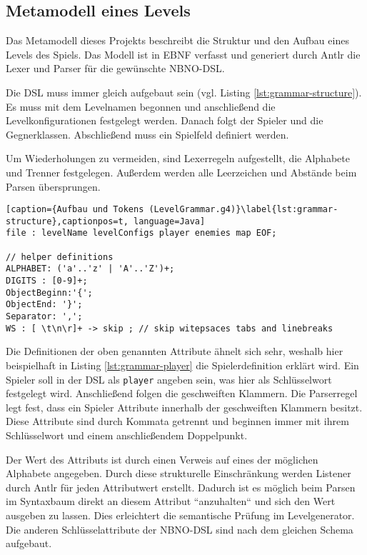 \subsection{Metamodell eines Levels}
Das Metamodell dieses Projekts beschreibt die Struktur und den Aufbau eines Levels des Spiels. Das Modell ist in EBNF verfasst und generiert durch Antlr die Lexer und Parser für die gewünschte NBNO-DSL.

Die DSL muss immer gleich aufgebaut sein (vgl. Listing \ref{lst:grammar-structure}). Es muss mit dem Levelnamen begonnen und anschließend die Levelkonfigurationen festgelegt werden. Danach folgt der Spieler und die Gegnerklassen. Abschließend muss ein Spielfeld definiert werden.

Um Wiederholungen zu vermeiden, sind Lexerregeln aufgestellt, die Alphabete und Trenner festgelegen.
Außerdem werden alle Leerzeichen und Abstände beim Parsen übersprungen.

\begin{lstlisting}[caption={Aufbau und Tokens (LevelGrammar.g4)}\label{lst:grammar-structure},captionpos=t, language=Java] 
file : levelName levelConfigs player enemies map EOF;

// helper definitions
ALPHABET: ('a'..'z' | 'A'..'Z')+;
DIGITS : [0-9]+;
ObjectBeginn:'{';
ObjectEnd: '}';
Separator: ',';
WS : [ \t\n\r]+ -> skip ; // skip witepsaces tabs and linebreaks
\end{lstlisting}
 
Die Definitionen der oben genannten Attribute ähnelt sich sehr, weshalb hier beispielhaft in Listing \ref{lst:grammar-player} die Spielerdefinition erklärt wird.
Ein Spieler soll in der DSL als \texttt{player} angeben sein, was hier als Schlüsselwort festgelegt wird.
Anschließend folgen die geschweiften Klammern. Die Parserregel legt fest, dass ein Spieler Attribute innerhalb der geschweiften Klammern besitzt. Diese Attribute sind durch Kommata getrennt und beginnen immer mit ihrem Schlüsselwort und einem anschließendem Doppelpunkt. 

Der Wert des Attributs ist durch einen Verweis auf eines der möglichen Alphabete angegeben. Durch diese strukturelle Einschränkung werden Listener durch Antlr für jeden Attributwert erstellt. Dadurch ist es möglich beim Parsen im Syntaxbaum direkt an diesem Attribut ``anzuhalten`` und sich den Wert ausgeben zu lassen. Dies erleichtert die semantische Prüfung im Levelgenerator. Die anderen Schlüsselattribute der NBNO-DSL sind nach dem gleichen Schema aufgebaut. 

